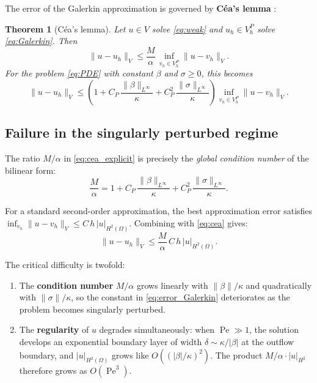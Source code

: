 \documentclass[11pt]{article}
\newcommand{\Vp}{V_h^P}
\newcommand{\dom}{\Omega}
\newcommand{\Pe}{\operatorname{Pe}}
\newtheorem{theorem}{Theorem}[section]
\theoremstyle{remark}
\begin{document}
The error of the Galerkin approximation is governed by \textbf{C\'ea's lemma} \cite{brenner2008mathematical}:

\begin{theorem}[C\'ea's lemma]
\label{thm:cea}
Let $u \in V$ solve \eqref{eq:weak} and $u_h \in \Vp$ solve \eqref{eq:Galerkin}. Then
\begin{equation}\label{eq:cea}
\|u - u_h\|_V \leq \frac{M}{\alpha}\,\inf_{v_h \in \Vp}\|u - v_h\|_V.
\end{equation}
For the problem \eqref{eq:PDE} with constant $\beta$ and $\sigma \geq 0$, this becomes
\begin{equation}\label{eq:cea_explicit}
\|u - u_h\|_V \leq \left(1 + C_P\,\frac{\|\beta\|_{L^\infty}}{\kappa} + C_P^2\,\frac{\|\sigma\|_{L^\infty}}{\kappa}\right)\inf_{v_h \in \Vp}\|u - v_h\|_V.
\end{equation}
\end{theorem}

\subsection{Failure in the singularly perturbed regime}

The ratio $M/\alpha$ in \eqref{eq:cea_explicit} is precisely the \emph{global condition number} of the bilinear form:
\begin{equation}\label{eq:condition}
\frac{M}{\alpha} = 1 + C_P\,\frac{\|\beta\|_{L^\infty}}{\kappa} + C_P^2\,\frac{\|\sigma\|_{L^\infty}}{\kappa}.
\end{equation}

For a standard second-order approximation, the best approximation error satisfies $\inf_{v_h}\|u - v_h\|_V \leq C\,h\,|u|_{H^2(\dom)}$. Combining with \eqref{eq:cea} gives:
\begin{equation}\label{eq:error_Galerkin}
\|u - u_h\|_V \leq \frac{M}{\alpha}\,C\,h\,|u|_{H^2(\dom)}.
\end{equation}

The critical difficulty is twofold:
\begin{enumerate}[label=(\roman*)]
    \item The \textbf{condition number} $M/\alpha$ grows linearly with $\|\beta\|/\kappa$ and quadratically with $\|\sigma\|/\kappa$, so the constant in \eqref{eq:error_Galerkin} deteriorates as the problem becomes singularly perturbed.
    \item The \textbf{regularity} of $u$ degrades simultaneously: when $\Pe \gg 1$, the solution develops an exponential boundary layer of width $\delta \sim \kappa/|\beta|$ at the outflow boundary, and $|u|_{H^2(\dom)}$ grows like $O((|\beta|/\kappa)^2)$. The product $M/\alpha \cdot |u|_{H^2}$ therefore grows as $O(\Pe^3)$.
\end{enumerate}
\end{document}
